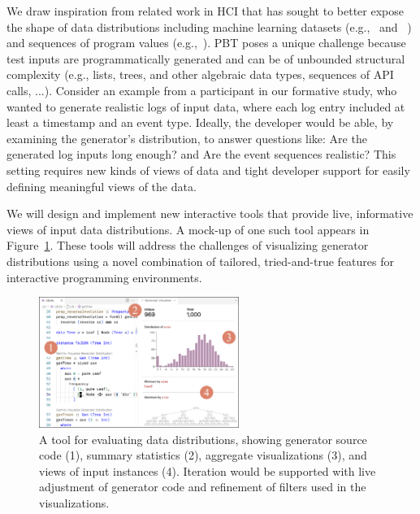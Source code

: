 We draw inspiration from related work in HCI that has sought to better expose
the shape of data distributions including
machine learning datasets
(e.g.,~\cite{ref:hohman2019gamut} and
~\cite{ref:hohman2020understanding}) and sequences of program values
(e.g.,~\cite{ref:kang2017omnicode}).
PBT poses a unique challenge because test inputs are
programmatically generated and
can be of unbounded structural
complexity (e.g., lists, trees, and other algebraic data types,
sequences of API calls, ...).
Consider an
example from a participant in our formative study, who wanted to generate
realistic logs of input data, where each log entry included at least a timestamp
and an event type.
Ideally, the developer would be able, by examining the generator's
distribution, to answer
questions like: Are the generated log inputs long enough? and Are the
event sequences
realistic?  This setting requires new kinds of views of data and tight
developer support for easily defining meaningful views of the data.


We will design and implement new interactive tools that provide live,
informative views of input data distributions. A mock-up of one such tool appears
in Figure~\ref{fig:gen-vis}. These tools will address the
challenges of visualizing generator distributions using a novel combination of
tailored, tried-and-true features for interactive programming
environments.

\begin{figure}
  \centering
  \includegraphics[width=0.58\textwidth]{assets/gen-vis.pdf}
  \caption{A tool for evaluating data distributions, showing
  generator source code (1), summary statistics (2),
  aggregate visualizations (3), and views of input instances
  (4). Iteration would be supported with live adjustment of
  generator code and refinement of filters used in the
  visualizations.}\label{fig:gen-vis}
\end{figure}

